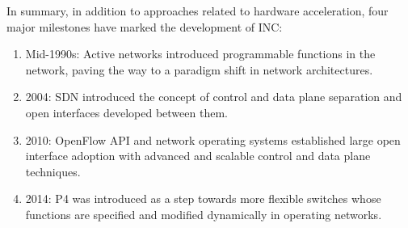 In summary, in addition to approaches related to hardware acceleration, four major milestones have marked the development of INC: 
\begin{enumerate}
    \item Mid-1990s: Active networks introduced programmable functions in the network, paving the way to a paradigm shift in network architectures.
    \item 2004: SDN introduced the concept of control and data plane separation and open interfaces developed between them.
    \item 2010: OpenFlow API and network operating systems established large open interface adoption with advanced and scalable control and data plane techniques. 
    \item 2014: P4 was introduced as a step towards more flexible switches whose functions are specified and modified dynamically in operating networks.
\end{enumerate}

